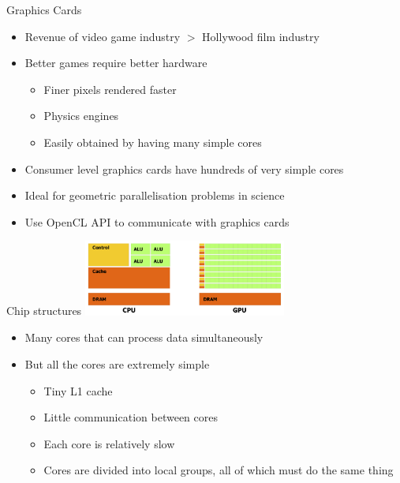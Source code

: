\documentclass{beamer}
\begin{document}
\begin{frame}{Graphics Cards}
\begin{itemize}
\item Revenue of video game industry $>$ Hollywood film industry
\item Better games require better hardware
\begin{itemize}
\item Finer pixels rendered faster
\item Physics engines
\item Easily obtained by having many simple cores
\end{itemize}
\item Consumer level graphics cards have hundreds of very simple cores
\item Ideal for geometric parallelisation problems in science
\item Use OpenCL API to communicate with graphics cards

\end{itemize}
\end{frame}


\begin{frame}{Chip structures}
\includegraphics[height=2.5cm]{cpugpu.png}
\begin{itemize}
\item Many cores that can process data simultaneously
\item But all the cores are extremely simple
\begin{itemize}
\item Tiny L1 cache
\item Little communication between cores
\item Each core is relatively slow
\item Cores are divided into local groups, all of which must do the same thing
\end{itemize}

\end{itemize}
\end{frame}
\end{document}
